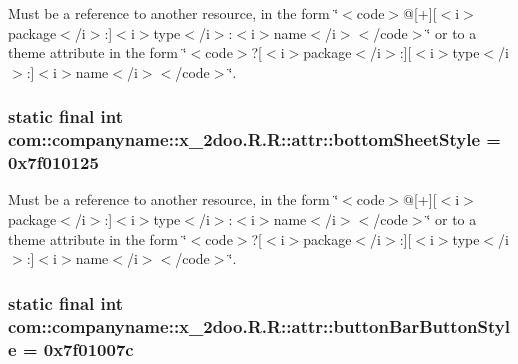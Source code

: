 Must be a reference to another resource, in the form \char`\"{}$<$code$>$@\mbox{[}+\mbox{]}\mbox{[}$<$i$>$package$<$/i$>$:\mbox{]}$<$i$>$type$<$/i$>$:$<$i$>$name$<$/i$>$$<$/code$>$\char`\"{} or to a theme attribute in the form \char`\"{}$<$code$>$?\mbox{[}$<$i$>$package$<$/i$>$:\mbox{]}\mbox{[}$<$i$>$type$<$/i$>$:\mbox{]}$<$i$>$name$<$/i$>$$<$/code$>$\char`\"{}. \hypertarget{classcom_1_1companyname_1_1x__2doo_1_1_r_1_1attr_cdb4a98eb0eebeb8446ab94f8529f4de}{
\subsubsection[{bottomSheetStyle}]{\setlength{\rightskip}{0pt plus 5cm}static final int com::companyname::x\_\-2doo.R.R::attr::bottomSheetStyle = 0x7f010125}}
\label{classcom_1_1companyname_1_1x__2doo_1_1_r_1_1attr_cdb4a98eb0eebeb8446ab94f8529f4de}


Must be a reference to another resource, in the form \char`\"{}$<$code$>$@\mbox{[}+\mbox{]}\mbox{[}$<$i$>$package$<$/i$>$:\mbox{]}$<$i$>$type$<$/i$>$:$<$i$>$name$<$/i$>$$<$/code$>$\char`\"{} or to a theme attribute in the form \char`\"{}$<$code$>$?\mbox{[}$<$i$>$package$<$/i$>$:\mbox{]}\mbox{[}$<$i$>$type$<$/i$>$:\mbox{]}$<$i$>$name$<$/i$>$$<$/code$>$\char`\"{}. \hypertarget{classcom_1_1companyname_1_1x__2doo_1_1_r_1_1attr_c2ebc2922f120882fc541367a64b8410}{
\subsubsection[{buttonBarButtonStyle}]{\setlength{\rightskip}{0pt plus 5cm}static final int com::companyname::x\_\-2doo.R.R::attr::buttonBarButtonStyle = 0x7f01007c}}
\label{classcom_1_1companyname_1_1x__2doo_1_1_r_1_1attr_c2ebc2922f120882fc541367a64b8410}


